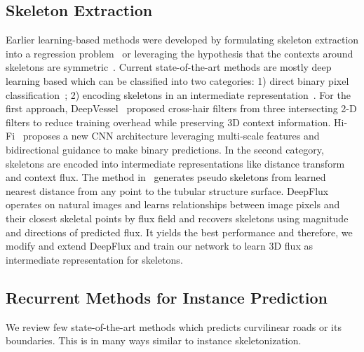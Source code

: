 \subsection{Skeleton Extraction} Earlier learning-based methods were developed by formulating skeleton extraction into a regression problem~\cite{Sironi2014} or leveraging the hypothesis that the contexts around skeletons are symmetric~\cite{Tsogkas2012}. Current state-of-the-art methods are mostly deep learning based which can be classified into two categories: 1) direct binary pixel classification~\cite{Tetteh2018,hifi2018,Liu2017}; 2) encoding skeletons in an intermediate representation~\cite{wang2019deep,Wang2019,sironi2015}. 
For the first approach, DeepVessel~\cite{Tetteh2018} proposed cross-hair filters from three intersecting 2-D filters to reduce training overhead while preserving 3D context information. Hi-Fi~\cite{hifi2018} proposes a new CNN architecture leveraging multi-scale features and bidirectional guidance to make binary predictions. In the second category, skeletons are encoded into intermediate representations like distance transform and context flux. The method in~\cite{wang2019deep} generates pseudo skeletons from learned nearest distance from any point to the tubular structure surface. DeepFlux~\cite{Wang2019} operates on natural images and learns relationships between image pixels and their closest skeletal points by flux field and recovers skeletons using magnitude and directions of predicted flux. It yields the best performance and therefore, we modify and extend DeepFlux and train our network to learn 3D flux as intermediate representation for skeletons. 


\subsection{Recurrent Methods for Instance Prediction}
We review few state-of-the-art methods which predicts curvilinear roads or its boundaries. This is in many ways similar to instance skeletonization. 


